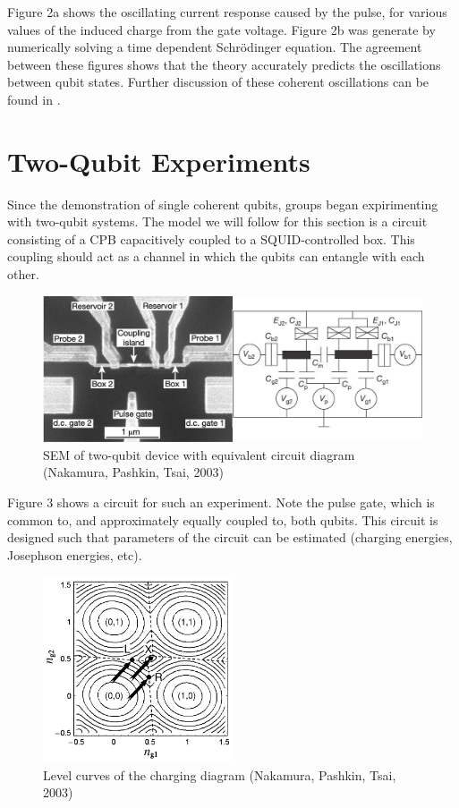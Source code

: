 \documentclass[12pt,letterpaper,notitlepage]{report}
\begin{document}
Figure 2a shows the oscillating current response caused by the pulse, for various values of the induced charge from the gate voltage. Figure 2b was generate by numerically solving a time dependent Schr\"odinger equation. The agreement between these figures shows that the theory accurately predicts the oscillations between qubit states. Further discussion of these coherent oscillations can be found in \cite{singleCPB}.

%
%

\section*{Two-Qubit Experiments}

Since the demonstration of single coherent qubits, groups began expirimenting with two-qubit systems. The model we will follow for this section is a circuit consisting of a CPB capacitively coupled to a SQUID-controlled box. This coupling should act as a channel in which the qubits can entangle with each other.

\begin{figure}[ht]
    \centering
    \includegraphics[width=\textwidth]{img/two-qubit-circuit.jpg}
    \caption{SEM of two-qubit device with equivalent circuit diagram (Nakamura, Pashkin, Tsai, 2003) \cite{onePulseGateNature}}
\end{figure}

Figure 3 shows a circuit for such an experiment. Note the pulse gate, which is common to, and approximately equally coupled to, both qubits. This circuit is designed such that parameters of the circuit can be estimated (charging energies, Josephson energies, etc).

\begin{figure}[ht]
    \centering
    \includegraphics[width=0.5\textwidth]{img/charging-level-curves.jpg}
    \caption{Level curves of the charging diagram (Nakamura, Pashkin, Tsai, 2003) \cite{onePulseGateNature}}
\end{figure}
\end{document}
